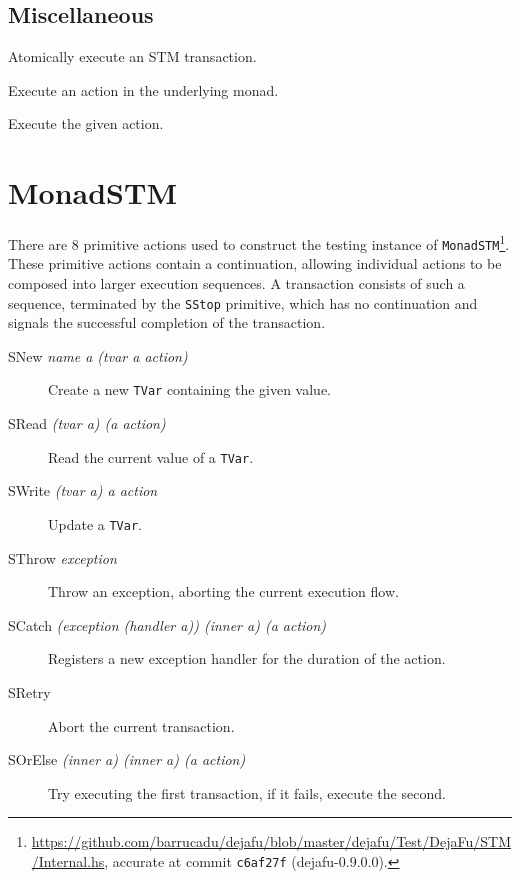 \subsection{Miscellaneous}

\begin{description}
  Atomically execute an STM transaction.

  Execute an action in the underlying monad.

  Execute the given action.
\end{description}

\section{MonadSTM}
\label{app:primops-stm}

\renewcommand{\defineprim}[2]{\item[#1 \textit{#2}]}

There are 8 primitive actions used to construct the testing instance of
\verb|MonadSTM|\footnote{\url{https://github.com/barrucadu/dejafu/blob/master/dejafu/Test/DejaFu/STM/Internal.hs},
  accurate at commit \texttt{c6af27f} (dejafu-0.9.0.0).}.  These primitive
actions contain a continuation, allowing individual actions to be composed into
larger execution sequences.  A transaction consists of such a sequence,
terminated by the \verb|SStop| primitive, which has no continuation and signals
the successful completion of the transaction.

\begin{description}
\defineprim{SNew}{name a (tvar a \arr action)}
  Create a new \verb|TVar| containing the given value.

\defineprim{SRead}{(tvar a) (a \arr action)}
  Read the current value of a \verb|TVar|.

\defineprim{SWrite}{(tvar a) a action}
  Update a \verb|TVar|.

\defineprim{SThrow}{exception}
  Throw an exception, aborting the current execution flow.

\defineprim{SCatch}{(exception \arr (handler a)) (inner a) (a \arr action)}
  Registers a new exception handler for the duration of the action.

\defineprim{SRetry}{}
  Abort the current transaction.

\defineprim{SOrElse}{(inner a) (inner a) (a \arr action)}
  Try executing the first transaction, if it fails, execute the
  second.
\end{description}
